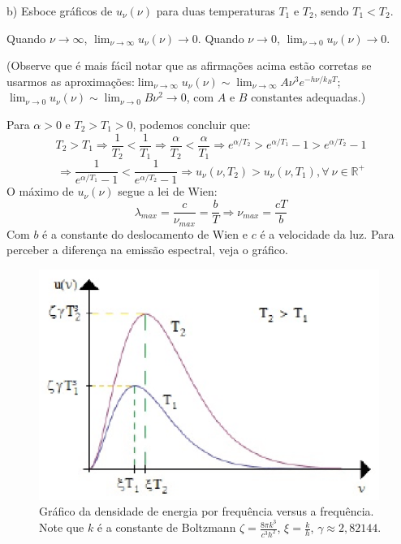\begin{enumerate}[start=1,label={\bfseries Q\arabic*.}]
b) Esboce gráficos de $u_{\nu}(\nu)$ para duas temperaturas $T_{1}$ e $T_{2}$, sendo $T_{1} < T_{2}$.

\resposta Quando $\nu \rightarrow \infty$, $\lim_{\nu \rightarrow \infty} u_{\nu} (\nu) \rightarrow 0$.
Quando $\nu \rightarrow 0$, $\lim_{\nu \rightarrow 0} u_{\nu} (\nu) \rightarrow 0$.

(Observe que é mais fácil notar que as afirmações acima estão corretas se usarmos as aproximações:$ \lim_{\nu \rightarrow \infty} u_{\nu} (\nu) \sim
\lim_{\nu \rightarrow \infty} A \nu^{3} e^{-h\nu/k_{B}T}$; $ \lim_{\nu \rightarrow 0} u_{\nu} (\nu) \sim
\lim_{\nu \rightarrow 0} B \nu^{2} \rightarrow 0$, com $A$ e $B$ constantes adequadas.)

Para $\alpha > 0$ e $T_{2} > T_{1} > 0$, podemos concluir que:
$$
T_{2} > T_{1} \Rightarrow \frac{1}{T_{2}} < \frac{1}{T_{1}} \Rightarrow  \frac{\alpha}{T_{2}} < \frac{\alpha}{T_{1}} \Rightarrow e^{\alpha/T_{2}} > e^{\alpha/T_{1}} - 1 > e^{\alpha/T_{2}} - 1
$$
$$
\Rightarrow \frac{1}{e^{\alpha/T_{1}} -1} < \frac{1}{e^{\alpha/T_{2}} -1} \Rightarrow u_{\nu}(\nu, T_{2}) > u_{\nu}(\nu, T_{1}), \forall \ \nu \in \mathbb{R}^{+}
$$
O máximo de $u_{\nu}(\nu)$ segue a lei de Wien:
$$
\lambda_{max} = \frac{c}{\nu_{max}} = \frac{b}{T} \Rightarrow \nu_{max} = \frac{cT}{b}
$$
Com $b$ é a constante do deslocamento de Wien e $c$ é a velocidade da luz. Para perceber a diferença na emissão espectral, veja o gráfico.
\begin{figure}[H]
  \centering
  \includegraphics[scale=0.8]{moderna-img/densidade.png}
  \caption{Gráfico da densidade de energia por frequência versus a frequência. Note que $k$ é a constante de Boltzmann $\zeta = \frac{8 \pi k^{3}}{c^{3} h^{2}}$, $\xi = \frac{k}{h}$, $\gamma \approx 2,82144$.}
\end{figure}




\end{enumerate}
